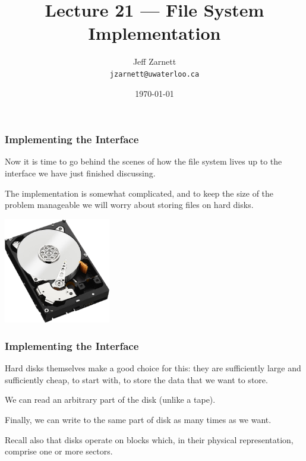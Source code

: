 

\title{Lecture 21 --- File System Implementation}

\author{Jeff Zarnett \\ \small \texttt{jzarnett@uwaterloo.ca}}
\date{\today}




\begin{frame}
  \titlepage

 \end{frame}



\begin{frame}
\frametitle{Implementing the Interface}

Now it is time to go behind the scenes of how the file system lives up to the interface we have just finished discussing. 

The implementation is somewhat complicated, and to keep the size of the problem manageable we will worry about storing files on hard disks.

\begin{center}
	\includegraphics[width=0.35\textwidth]{images/hdd.jpg}
\end{center}

 \end{frame}



\begin{frame}
\frametitle{Implementing the Interface}

 Hard disks themselves make a good choice for this: they are sufficiently large and sufficiently cheap, to start with, to store the data that we want to store. 
 
 We can read an arbitrary part of the disk (unlike a tape). 
 
Finally, we can write to the same part of disk as many times as we want. 
 
Recall also that disks operate on blocks which, in their physical representation, comprise one or more sectors.


\end{frame}

